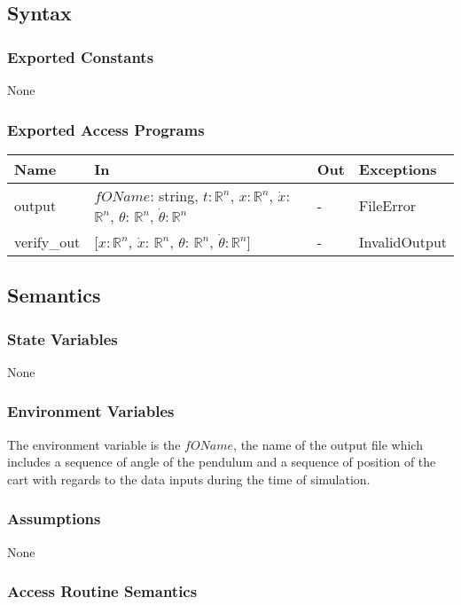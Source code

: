 \documentclass[12pt, titlepage]{article}
\begin{document}
\subsection{Syntax}

\subsubsection{Exported Constants}
None
\subsubsection{Exported Access Programs}

\begin{center}
\begin{tabular}{p{2cm} p{8cm} p{2cm} p{2cm}}
\hline
\textbf{Name} & \textbf{In} & \textbf{Out} & \textbf{Exceptions} \\
\hline
 output& $fOName$: string, $t$$: \mathbb{R}^{n}$, $x$$: \mathbb{R}^{n}$, $\dot{x}$: $\mathbb{R}^{n}$, $\theta$: $\mathbb{R}^{n}$, $\dot{\theta}$$: 
 \mathbb{R}^{n}$ & - & FileError\\
verify\_out&  [$x$$: \mathbb{R}^{n}$, $\dot{x}$: $\mathbb{R}^{n}$, $\theta$: $\mathbb{R}^{n}$, $\dot{\theta}$$: 
 \mathbb{R}^{n}$] & - & InvalidOutput \\
\end{tabular}
\end{center}

\subsection{Semantics}

\subsubsection{State Variables}
None
\subsubsection{Environment Variables}
The environment variable is the $fOName$, the name of the output file which includes a sequence of angle of the pendulum and a sequence of position of the cart with regards to the data inputs during the time of simulation.

\subsubsection{Assumptions}
None
\subsubsection{Access Routine Semantics}
\end{document}
